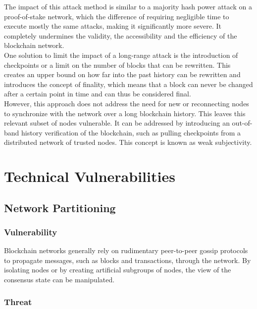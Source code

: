 \documentclass[11pt,a4paper,draft]{article}
\begin{document}
The impact of this attack method is similar to a majority hash power attack on a proof-of-stake network, which the difference of requiring negligible time to execute mostly the same attacks, making it significantly more severe. It completely undermines the validity, the accessibility and the efficiency of the blockchain network.\\

One solution to limit the impact of a long-range attack is the introduction of checkpoints or a limit on the number of blocks that can be rewritten. This creates an upper bound on how far into the past history can be rewritten and introduces the concept of finality, which means that a block can never be changed after a certain point in time and can thus be considered final.\\

However, this approach does not address the need for new or reconnecting nodes to synchronize with the network over a long blockchain history. This leaves this relevant subset of nodes vulnerable. It can be addressed by introducing an out-of-band history verification of the blockchain, such as pulling checkpoints from a distributed network of trusted nodes. This concept is known as weak subjectivity.\\

\section{Technical Vulnerabilities}

\subsection{Network Partitioning}

\subsubsection{Vulnerability}

Blockchain networks generally rely on rudimentary peer-to-peer gossip protocols to propagate messages, such as blocks and transactions, through the network. By isolating nodes or by creating artificial subgroups of nodes, the view of the consensus state can be manipulated.\\

\subsubsection{Threat}
\end{document}
